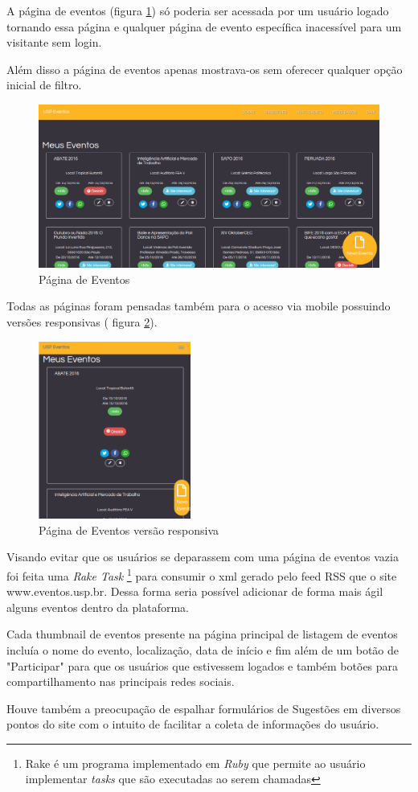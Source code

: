 		\par A página de eventos (figura \ref{fig:events_pagev1}) só poderia ser acessada por um usuário logado tornando essa página e qualquer página de evento específica inacessível para um visitante sem login.
        \par Além disso a página de eventos apenas mostrava-os  sem oferecer qualquer opção inicial de filtro.
        \begin{figure}[htb]
		\includegraphics[width=15cm]{figuras/events_pagev1}
		\caption{\label{fig:events_pagev1} Página de Eventos}
		\end{figure}
\par Todas as páginas foram pensadas também para o acesso via mobile possuindo versões responsivas ( figura \ref{fig:events_pagev1_responsive}).
        \begin{figure}[htb]
		\includegraphics[width=5cm]{figuras/events_pagev1_responsive}
		\caption{\label{fig:events_pagev1_responsive} Página de Eventos versão responsiva}
		\end{figure}        
\par Visando evitar que os usuários se deparassem com uma página de eventos vazia foi feita uma \emph{Rake Task} \footnote{Rake é um programa implementado em \emph{Ruby} que permite ao usuário implementar \emph{tasks} que são executadas ao serem chamadas} para consumir o xml gerado pelo feed RSS que o site www.eventos.usp.br. Dessa forma seria possível adicionar de forma mais ágil alguns eventos dentro da plataforma.
\par Cada thumbnail de eventos presente na página principal de listagem de eventos incluía o nome do evento, localização, data de início e fim além de um botão de "Participar" para que os usuários que estivessem logados e também botões para compartilhamento nas principais redes sociais.
\par Houve também a preocupação de espalhar formulários de Sugestões em diversos pontos do site com o intuito de facilitar a coleta de informações do usuário.
